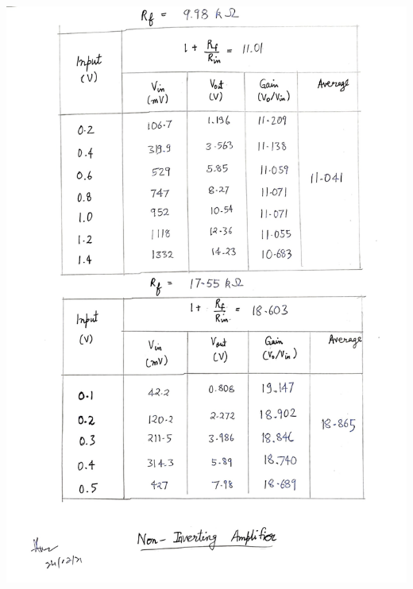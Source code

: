 \clearpage
\begin{center}
    \includegraphics[scale = 0.25]{OPAMP Config/noninvamp.jpg}
\end{center}
\clearpage
